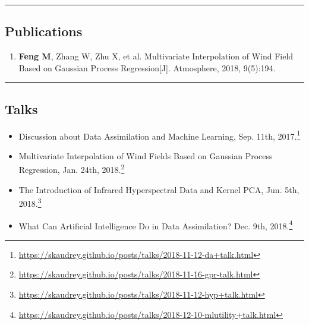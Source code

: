 \documentclass[10pt,letterpaper]{article}
\begin{document}
\hrule
\vspace{-0.4em}
\subsection*{Publications}

\begin{enumerate}
	\parskip=0.1em
	
	\item \textbf{Feng M}, Zhang W, Zhu X, et al. Multivariate Interpolation of Wind Field Based on Gaussian Process Regression[J]. Atmosphere, 2018, 9(5):194.
	
%	

\end{enumerate}

\hrule
\vspace{-0.4em}
\subsection*{Talks}

\begin{itemize}
	\parskip=0.1em
	
	\item Discussion about Data Assimilation and Machine Learning, Sep. 11th, 2017.\footnote{\url{https://skaudrey.github.io/posts/talks/2018-11-12-da+talk.html}}

	\item Multivariate Interpolation of Wind Fields Based on Gaussian Process Regression, Jan. 24th, 2018.\footnote{\url{https://skaudrey.github.io/posts/talks/2018-11-16-gpr-talk.html}}
	
	\item The Introduction of Infrared Hyperspectral Data and Kernel PCA, Jun. 5th, 2018.\footnote{\url{https://skaudrey.github.io/posts/talks/2018-11-12-hyp+talk.html}}

	\item What Can Artificial Intelligence Do in Data Assimilation? Dec. 9th, 2018.\footnote{\url{https://skaudrey.github.io/posts/talks/2018-12-10-mlutility+talk.html}}
	
\end{itemize}
\end{document}
